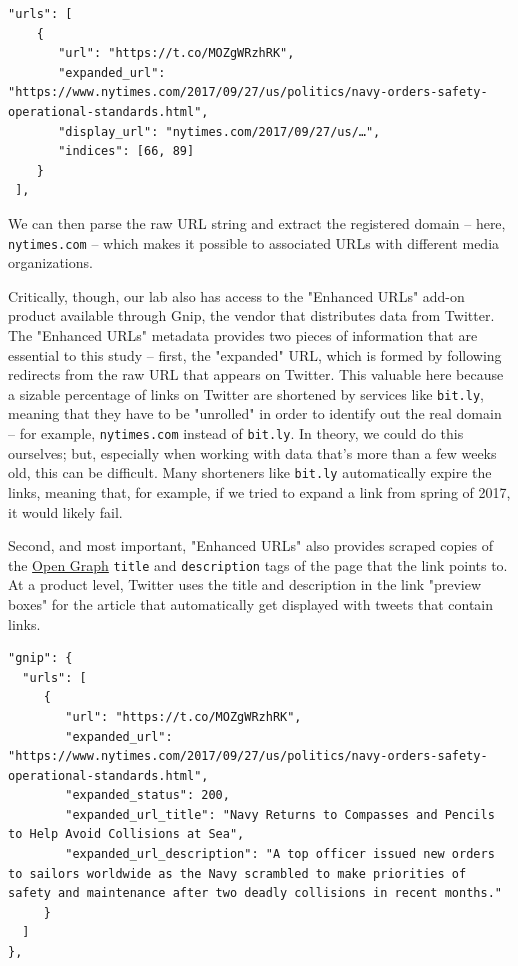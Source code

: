 \documentclass{scrartcl}
\begin{document}
\begin{lstlisting}
"urls": [
    {
       "url": "https://t.co/MOZgWRzhRK",
       "expanded_url": "https://www.nytimes.com/2017/09/27/us/politics/navy-orders-safety-operational-standards.html",
       "display_url": "nytimes.com/2017/09/27/us/…",
       "indices": [66, 89]
    }
 ],
\end{lstlisting}

We can then parse the raw URL string and extract the registered domain -- here, \texttt{nytimes.com} -- which makes it possible to associated URLs with different media organizations.

Critically, though, our lab also has access to the "Enhanced URLs" add-on product available through Gnip, the vendor that distributes data from Twitter. The "Enhanced URLs" metadata provides two pieces of information that are essential to this study -- first, the "expanded" URL, which is formed by following redirects from the raw URL that appears on Twitter. This valuable here because a sizable percentage of links on Twitter are shortened by services like \texttt{bit.ly}, meaning that they have to be "unrolled" in order to identify out the real domain -- for example, \texttt{nytimes.com} instead of \texttt{bit.ly}. In theory, we could do this ourselves; but, especially when working with data that's more than a few weeks old, this can be difficult. Many shorteners like \texttt{bit.ly} automatically expire the links, meaning that, for example, if we tried to expand a link from spring of 2017, it would likely fail.

Second, and most important, "Enhanced URLs" also provides scraped copies of the \href{http://ogp.me/}{Open Graph} \texttt{title} and \texttt{description} tags of the page that the link points to. At a product level, Twitter uses the title and description in the link "preview boxes" for the article that automatically get displayed with tweets that contain links.

\begin{lstlisting}
"gnip": {
  "urls": [
     {
        "url": "https://t.co/MOZgWRzhRK",
        "expanded_url": "https://www.nytimes.com/2017/09/27/us/politics/navy-orders-safety-operational-standards.html",
        "expanded_status": 200,
        "expanded_url_title": "Navy Returns to Compasses and Pencils to Help Avoid Collisions at Sea",
        "expanded_url_description": "A top officer issued new orders to sailors worldwide as the Navy scrambled to make priorities of safety and maintenance after two deadly collisions in recent months."
     }
  ]
},
\end{lstlisting}
\end{document}
